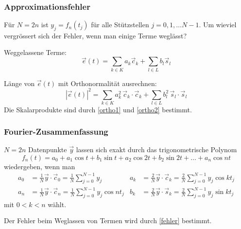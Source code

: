 %
%
\begin{frame}
\frametitle{Approximationsfehler}
\begin{frage}
Für $N=2n$ ist $y_j=f_n(t_j)$ für alle Stützstellen $j=0,1,\dots N-1$.
Um wieviel vergrössert sich der Fehler, wenn man einige Terme weglässt?
\end{frage}

Weggelassene Terme:
\[
\vec{e}(t)
=
\sum_{k\in K}a_k\vec{c}_k
+
\sum_{l\in L}b_l\vec{s}_l
\]

\begin{antwort}
Länge von $\vec{e}(t)$ mit Orthonormalität ausrechnen:
\begin{equation}
|\vec{e}(t)|^2
=
\sum_{k\in K} a_k^2\, \vec{c}_k\cdot\vec{c}_k
+
\sum_{l\in L} b_l^2\, \vec{s}_l\cdot\vec{s}_l
\label{fehler}
\end{equation}
Die Skalarprodukte sind durch
\eqref{ortho1}
und
\eqref{ortho2}
bestimmt.
\end{antwort}
\end{frame}

%
%
\begin{frame}
\frametitle{Fourier-Zusammenfassung}
$N=2n$ Datenpunkte $\vec{y}$ lassen sich exakt durch das
trigonometrische Polynom
\[
f_n(t)
=
a_0 + a_1\cos t+b_1\sin t + a_2\cos 2t + b_2\sin 2t + \dots + a_n\cos nt
\]
wiedergeben, wenn man
\begin{align*}
a_0
&=
\frac1N\vec{y}\cdot\vec{c}_0
=
\frac1N\sum_{j=0}^{N-1} y_j
&
a_k
&=
\frac2N\vec{y}\cdot\vec{c}_k
=
\frac2N\sum_{j=0}^{N-1} y_j\cos kt_j
\\
a_n
&=
\frac1N\vec{y}\cdot\vec{c}_n
=
\frac1N\sum_{j=0}^{N-1} y_j\cos nt_j
&
b_k
&=
\frac2N\vec{y}\cdot\vec{s}_k
=
\frac2N\sum_{j=0}^{N-1} y_j\sin kt_j
\end{align*}
mit $0<k<n$
wählt.
\bigskip

Der Fehler beim Weglassen von Termen wird durch \eqref{fehler}
bestimmt.

\end{frame}

